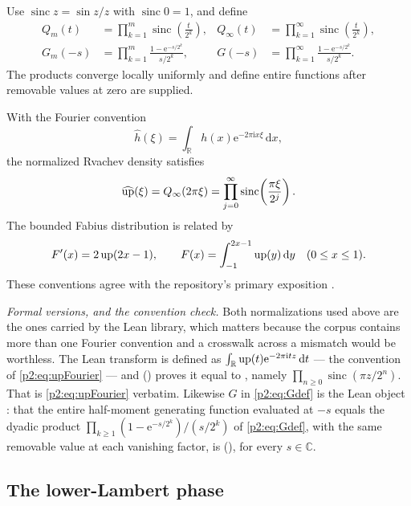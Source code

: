 \documentclass[11pt,oneside]{article}
\numberwithin{equation}{section}
\theoremstyle{definition}
\theoremstyle{remark}
\newcommand{\R}{\mathbb R}
\newcommand{\C}{\mathbb C}
\newcommand{\e}{\mathrm e}
\newcommand{\ii}{\mathrm i}
\newcommand{\dd}{\,\mathrm d}
\newcommand{\sinc}{\operatorname{sinc}}
\begin{document}
Use $\sinc z=\sin z/z$ with $\sinc0=1$, and define
\begin{align}
 Q_m(t)&=\prod_{k=1}^{m}\sinc\!\left(\frac{t}{2^k}\right),
 &Q_\infty(t)&=\prod_{k=1}^{\infty}\sinc\!\left(\frac{t}{2^k}\right),
 \label{p2:eq:Qdef}\\
 G_m(-s)&=\prod_{k=1}^{m}\frac{1-\e^{-s/2^k}}{s/2^k},
 &G(-s)&=\prod_{k=1}^{\infty}\frac{1-\e^{-s/2^k}}{s/2^k}.
 \label{p2:eq:Gdef}
\end{align}
The products converge locally uniformly and define entire functions after removable values
at zero are supplied.

With the Fourier convention
\[
 \widehat h(\xi)=\int_{\R}h(x)\e^{-2\pi\ii x\xi}\dd x,
\]
the normalized Rvachev density satisfies
\begin{equation}
 \widehat{\Up}(\xi)=Q_\infty(2\pi\xi)
 =\prod_{j=0}^{\infty}\sinc\!\left(\frac{\pi\xi}{2^j}\right).
 \label{p2:eq:upFourier}
\end{equation}
The bounded Fabius distribution is related by
\begin{equation}
 F'(x)=2\Up(2x-1),\qquad
 F(x)=\int_{-1}^{2x-1}\Up(y)\dd y\quad(0\le x\le1).
 \label{p2:eq:Fup}
\end{equation}
These conventions agree with the repository's primary exposition
\cite{p2:proveit-primary,p2:arias1982}.

\emph{Formal versions, and the convention check.}  Both normalizations used above are the ones
carried by the Lean library, which matters because the corpus contains more than one Fourier
convention and a crosswalk across a mismatch would be worthless.  The Lean transform
 is defined as $\int_\R\Up(t)\e^{-2\pi\ii tz}\dd t$ --- the
convention of \eqref{p2:eq:upFourier} --- and
 () proves it equal to
, namely $\prod_{n\ge0}\sinc(\pi z/2^n)$.  That is
\eqref{p2:eq:upFourier} verbatim.  Likewise $G$ in \eqref{p2:eq:Gdef} is the Lean object
: that the entire half-moment generating function
evaluated at $-s$ equals the dyadic product $\prod_{k\ge1}(1-\e^{-s/2^k})/(s/2^k)$ of
\eqref{p2:eq:Gdef}, with the same removable value at each vanishing factor, is
(), for every $s\in\C$.

\subsection{The lower-Lambert phase}
\end{document}
